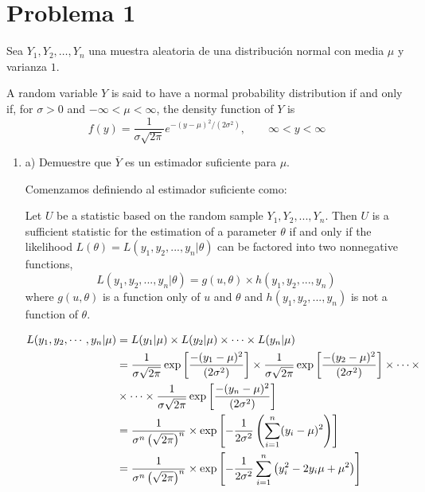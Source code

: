 \section{Problema 1}


Sea $Y_{1}, Y_{2}, \ldots, Y_{n}$ una muestra aleatoria de una distribución normal con media $\mu$ y varianza $1 .$
\begin{tcolorbox}[colback=gray!15,colframe=black!1!black,title=Definición 4.8 - Distribución Normal]
	A random variable $Y$ is said to have a normal probability distribution if and only if, for $\sigma >0$ and $-\infty<\mu<\infty$, the density function of $Y$ is
	$$f(y)=\frac{1}{\sigma\sqrt{2\pi}}e^{-(y-\mu)^2/(2\sigma^2)}, \qquad \infty<y<\infty$$
	\end{tcolorbox}
\begin{enumerate}
	\item a) Demuestre que $\overline{Y}$ es un estimador suficiente para $\mu$.
	\begin{solution}
		Comenzamos definiendo al estimador suficiente como:
		\begin{tcolorbox}[colback=gray!15,colframe=black!1!black,title=Teorema 9.4 - Estimador suficiente]
			Let $U$ be a statistic based on the random sample $Y_1, Y_2,..., Y_n$. Then $U$ is a sufficient statistic for the estimation of a parameter $\theta$ if and only if the likelihood $L(\theta) = L(y_1, y_2, . . . , y_n | \theta)$ can be factored into two nonnegative functions,
			$$L(y_1,y_2,...,y_n |\theta)=g(u,\theta)\times h(y_1, y_2,..., y_n)$$
			where $g(u,\theta)$ is a function only of $u$ and $\theta$ and $h(y_1,y_2,...,y_n)$ is not a function of $\theta$.
		\end{tcolorbox}
	\begin{align*}
		L(y_1,y_2,\cdots, y_n|\mu) &= L(y_1|\mu)\times L(y_2|\mu)\times \cdots \times L(y_n|\mu)\\
		&=
			\frac{1}{\sigma\sqrt{2\pi}}\exp\left[{-(y_1-\mu)^2 \over (2\sigma^2)}\right]\times \frac{1}{\sigma\sqrt{2\pi}}\exp\left[{-(y_2-\mu)^2 \over (2\sigma^2)}\right]\times \cdots \times\\
			& \times \cdots \times\frac{1}{\sigma\sqrt{2\pi}}\exp\left[{-(y_n-\mu)^2 \over (2\sigma^2)}\right]\\
			&= \frac{1}{\sigma^n\left(\sqrt{2\pi}\right)^n}\times \exp\left[-\frac{1}{2\sigma^2}\left(\sum_{i=1}^{n}(y_i-\mu)^2\right)\right]\\
			&= \frac{1}{\sigma^n\left(\sqrt{2\pi}\right)^n}\times \exp\left[-\frac{1}{2\sigma^2}\sum_{i=1}^{n}\left(y^2_i-2y_i\mu+\mu^2\right)\right]\\

\end{align*}
\end{solution}
\end{enumerate}
